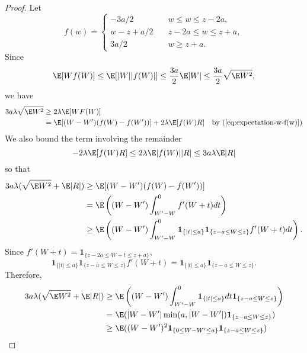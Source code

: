 \begin{proof}
  Let
  \begin{equation*}
    f(w) = 
    \begin{cases}
      -3a / 2 &\quad w \leq w \leq z - 2a, \\
      w - z + a / 2 &\quad z - 2a \leq w \leq z + a, \\
      3a / 2 &\quad w \geq z + a.
    \end{cases}
  \end{equation*}
  Since
  \begin{equation*}
    \E [W f(W)] \leq \E [|W| |f(W)|] \leq \frac{3a}{2} \E |W| \leq \frac{3a}{2} \sqrt{\E W^2},
  \end{equation*}
  we have 
  \begin{align*}
    3a \lambda \sqrt{\E W^2} &\geq 2\lambda \E[WF(W)] \\
    &= \E [(W-W')(f(W)-f(W'))] + 2 \lambda \E [f(W)R] \quad \text{by } (\ref{eq:expectation-w-f(w)})
  \end{align*}
  We also bound the term involving the remainder
  \begin{equation*}
    -2 \lambda \E[f(W) R ] \leq 2 \lambda \E|f(W)||R| \leq 3a\lambda \E |R|
  \end{equation*}
  so that 
  \begin{align*}
    3a \lambda (\sqrt{\E W^2} + \E |R|) &\geq \E [(W-W')(f(W)-f(W'))] \\
    &= \E \left ( (W-W') \int_{W'-W}^{0} f'(W+t)dt \right ) \\ 
    &\geq \E \left( (W-W') \int_{W'-W}^0 \mathbf{1}_{\{|t| \leq a\}} 
    \mathbf{1}_{\{z - a \leq W \leq z\}} f'(W + t) dt \right ).
  \end{align*}
  Since $f'(W + t) = \mathbf{1}_{\{z - 2a \leq W + t \leq z + a \}}$,
  \begin{equation*}
    \mathbf{1}_{\{|t| \leq a\}} \mathbf{1}_{\{z - a \leq W \leq z\}} f'(W + t) = 
    \mathbf{1}_{\{|t| \leq a\}} \mathbf{1}_{\{z - a \leq W \leq z\}}.
  \end{equation*}
  Therefore,
  \begin{align*}
    3a \lambda (\sqrt{\E W^2} + \E |R|) &\geq 
    \E \left( (W-W') \int_{W'-W}^0 \mathbf{1}_{\{|t| \leq a\}} dt
    \mathbf{1}_{\{z - a \leq W \leq z\}} \right ) \\
    &= \E(|W-W'| \min (a, |W-W'|) \mathbf{1}_{\{z - a \leq W \leq z\}}) \\
    &\geq \E((W-W')^2 \mathbf{1}_{\{0 \leq W - W' \leq a\}} \mathbf{1}_{\{z - a \leq W \leq z\}}) \\

\end{align*}
\end{proof}
